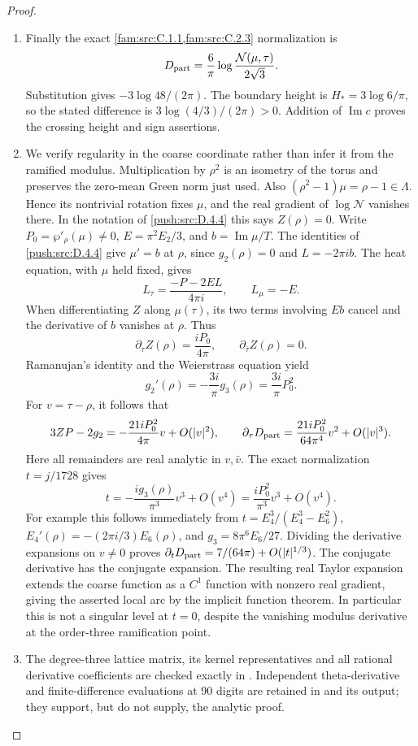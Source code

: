 \begin{proof}
\begin{enumerate}[label=\arabic*.,leftmargin=*]
\item Finally the exact \cref{fam:src:C.1.1,fam:src:C.2.3} normalization is
\[
 D_{\rm part}=\frac6\pi
          \log\frac{\mathcal N(\mu,\tau)}{2\sqrt3}.
\]
Substitution gives \(-3\log48/(2\pi)\). The boundary height is
\(H_*=3\log6/\pi\), so the stated difference is
\(3\log(4/3)/(2\pi)>0\). Addition of \(\operatorname{Im}c\)
proves the crossing height and sign assertions.

\item We verify regularity in the coarse coordinate rather than infer it
from the ramified modulus. Multiplication by \(\rho^2\) is an
isometry of the torus and preserves the zero-mean Green norm just
used. Also \((\rho^2-1)\mu=\rho-1\in\Lambda\). Hence its
nontrivial rotation fixes \(\mu\), and the real gradient of
\(\log\mathcal N\) vanishes there. In the notation of \ref{push:src:D.4.4} this
says \(Z(\rho)=0\). Write \(P_0=\wp'_\rho(\mu)\ne0\),
\(E=\pi^2E_2/3\), and \(b=\operatorname{Im}\mu/T\).
The identities of \ref{push:src:D.4.4} give \(\mu'=b\) at \(\rho\), since
\(g_2(\rho)=0\) and \(L=-2\pi ib\). The heat equation, with
\(\mu\) held fixed, gives
\[
 L_\tau=\frac{-P-2EL}{4\pi i},\qquad L_\mu=-E.
\]
When differentiating \(Z\) along \(\mu(\tau)\), its two terms
involving \(E b\) cancel and the derivative of \(b\) vanishes at
\(\rho\). Thus
\[
 \partial_\tau Z(\rho)=\frac{iP_0}{4\pi},\qquad
 \partial_{\bar\tau}Z(\rho)=0.
\]
Ramanujan's identity and the Weierstrass equation yield
\[
 g_2'(\rho)=-\frac{3i}{\pi}g_3(\rho)
            =\frac{3i}{\pi}P_0^2.
\]
For \(v=\tau-\rho\), it follows that
\[
 3ZP-2g_2=-\frac{21iP_0^2}{4\pi}v+O(|v|^2),\qquad
 \partial_\tau D_{\rm part}
       =\frac{21iP_0^2}{64\pi^4}v^2+O(|v|^3).
\]
Here all remainders are real analytic in \(v,\bar v\).
The exact normalization \(t=j/1728\) gives
\[
 t=-\frac{i g_3(\rho)}{\pi^3}v^3+O(v^4)
   =\frac{iP_0^2}{\pi^3}v^3+O(v^4).
\]
For example this follows immediately from
\(t=E_4^3/(E_4^3-E_6^2)\),
\(E_4'(\rho)=-(2\pi i/3)E_6(\rho)\), and
\(g_3=8\pi^6E_6/27\). Dividing the derivative expansions on
\(v\ne0\) proves
\(\partial_tD_{\rm part}=7/(64\pi)+O(|t|^{1/3})\).
The conjugate derivative has the conjugate expansion. The resulting
real Taylor expansion extends the coarse function as a \(C^1\)
function with nonzero real gradient, giving the asserted local arc
by the implicit function theorem. In particular this is not a
singular level at \(t=0\), despite the vanishing modulus derivative
at the order-three ramification point.

\item The degree-three lattice matrix, its kernel representatives and all
rational derivative coefficients are checked exactly in
. Independent theta-derivative
and finite-difference evaluations at 90 digits are retained in
 and its output;
they support, but do not supply, the analytic proof.
\end{enumerate}
\end{proof}

